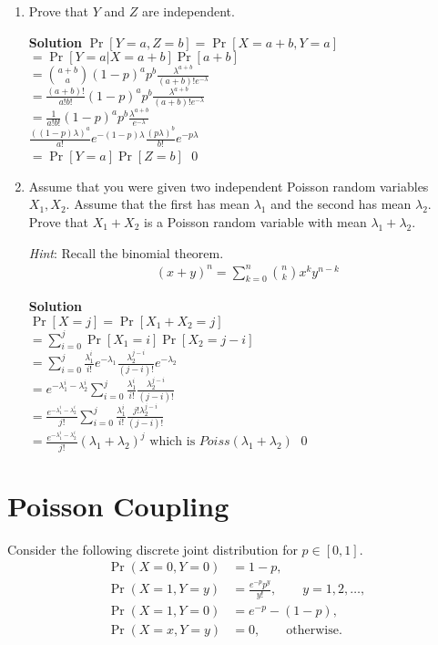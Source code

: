 \documentclass[11pt]{article}
\newcommand*{\Question}[1]{\section{#1}}
\newenvironment{Parts}{\begin{enumerate}[label=(\alph*)]}{\end{enumerate}}
\newcommand*{\Part}{\item}
\begin{document}
\begin{Parts}
	\Part Prove that $Y$ and $Z$ are independent.
\begin{mdframed} \textbf{Solution} 
$\Pr[Y=a,Z=b]=\Pr[X=a+b,Y=a]$ \\
$=\Pr[Y=a|X=a+b]\Pr[a+b]$ \\
$=\binom{a+b}{a}(1-p)^ap^b\frac{\lambda^{a+b}}{(a+b)!e^{-\lambda}}$ \\
$=\frac{(a+b)!}{a!b!}(1-p)^ap^b\frac{\lambda^{a+b}}{(a+b)!e^{-\lambda}}$ \\
$=\frac{1}{a!b!}(1-p)^ap^b\frac{\lambda^{a+b}}{e^{-\lambda}}$ \\
$\frac{((1-p)\lambda)^a}{a!}e^{-(1-p)\lambda}\frac{(p\lambda)^b}{b!}e^{-p\lambda}$ \\
$=\Pr[Y=a]\Pr[Z=b]$ \qed
\end{mdframed}

	\Part Assume that you were given two independent Poisson random variables $X_1, X_2$. Assume that the first has mean $\lambda_1$ and the second has mean $\lambda_2$. Prove that $X_1+X_2$ is a Poisson random variable with mean $\lambda_1+\lambda_2$.

	\textit{Hint}: Recall the binomial theorem.
	\begin{align*}
	    (x + y)^n = \sum_{k=0}^n \binom{n}{k} x^k y^{n-k}
	\end{align*}
\begin{mdframed} \textbf{Solution} \\
$\Pr[X=j]=\Pr[X_1+X_2=j]$ \\
$=\sum_{i=0}^{j}\Pr[X_1=i]\Pr[X_2=j-i]$ \\
$=\sum_{i=0}^{j}\frac{\lambda_1^i}{i!}e^{-\lambda_1}\frac{\lambda_2^{j-i}}{(j-i)!}e^{-\lambda_2}$ \\
$=e^{-\lambda_1^i-\lambda_2^i}\sum_{i=0}^{j}\frac{\lambda_1^i}{i!}\frac{\lambda_2^{j-i}}{(j-i)!}$ \\
$=\frac{e^{-\lambda_1^i-\lambda_2^i}}{j!}\sum_{i=0}^{j}\frac{\lambda_1^i}{i!}\frac{j!\lambda_2^{j-i}}{(j-i)!}$ \\
$=\frac{e^{-\lambda_1^i-\lambda_2^i}}{j!}(\lambda_1+\lambda_2)^j \text{ which is } Poiss(\lambda_1 + \lambda_2)$ \qed

\end{mdframed}
\end{Parts}


\Question{Poisson Coupling}

Consider the following discrete joint distribution for $p \in [0, 1]$.
\begin{align*}
    \Pr(X=0, Y=0) &= 1-p, \\
    \Pr(X=1, Y=y) &= \frac{e^{-p} p^y}{y!}, \qquad y = 1, 2, \dotsc, \\
    \Pr(X=1, Y=0) &= e^{-p} - (1-p), \\
    \Pr(X=x, Y=y) &= 0, \qquad \text{otherwise}.
\end{align*}
\end{document}
